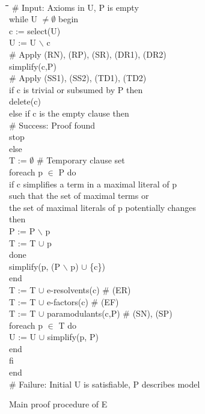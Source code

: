 \documentclass{article}
\begin{document}
\begin{figure}[htb]
  \begin{center}
    \tt
    \begin{tabbing}
      \quad\quad \= \quad\quad \= \quad\quad \=  \quad\quad \= \quad\quad \= \kill
      \# Input: Axioms in U, P is empty\\
      while U $\not= \emptyset{}$ begin\+\\
        c := select(U)\\
        U := U $\backslash$ c\\

        \# Apply (RN), (RP), (SR), (DR1), (DR2)\\
        simplify(c,P)\\
        \# Apply (SS1), (SS2), (TD1), (TD2)\\
        if c is trivial or subsumed by P then\+\\
          delete(c)\-\\
        else if c is the empty clause then\+\\
          \# Success: Proof found\\
          stop\-\\
        else\+\\
          T := $\emptyset{}$ \# Temporary clause set\\
          foreach p $\in$ P do\+\\
            if c simplifies a term in a maximal literal of p\\
               such that the set of maximal terms or\\
               the set of maximal literals of p potentially changes\\
               then\+\\
              P := P $\backslash$ p\\
              T := T $\cup$ p\-\\
            done\\
            simplify(p, (P $\backslash$ p) $\cup$ \{c\})\-\\
          end\\
          T := T $\cup$ e-resolvents(c)    \# (ER)\\
          T := T $\cup$ e-factors(c)       \# (EF)\\
          T := T $\cup$ paramodulants(c,P) \# (SN), (SP)\\
          foreach p $\in$ T do\+\\
            U := U $\cup$ simplify(p, P)\-\\
          end\-\\
        fi\-\\        
      end\\
      \# Failure: Initial U is satisfiable, P describes model
    \end{tabbing}
    \normalfont
    \caption{Main proof procedure of E}
    \label{fig:procedure}
  \end{center}
\end{figure}
\end{document}
